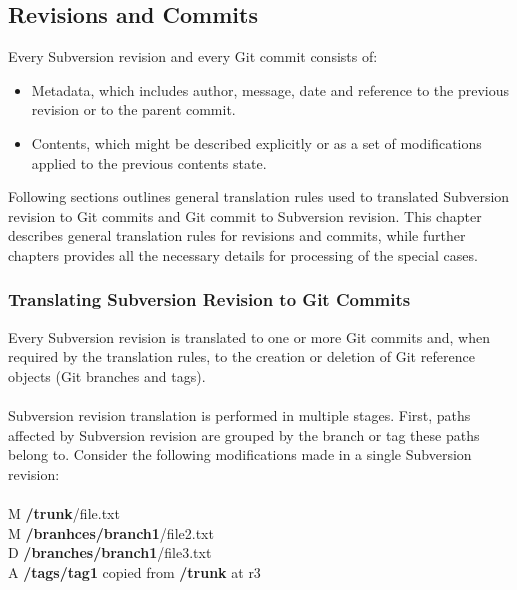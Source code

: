 \subsection{Revisions and Commits}
\label{section_revisions_and_commits}
\renewcommand{\figurename}{Diagram}
Every Subversion revision and every Git commit consists of:
\begin{itemize}
\item Metadata, which includes author, message, date and reference to the previous revision or to the parent commit.
\item Contents, which might be described explicitly or as a set of modifications applied to the previous contents state.
\end{itemize}
Following sections outlines general translation rules used to translated Subversion revision to Git commits and Git commit
to Subversion revision. This chapter describes general translation rules for revisions and commits, while further chapters provides all the 
necessary details for processing of the special cases.
\subsubsection{Translating Subversion Revision to Git Commits}
Every Subversion revision is translated to one or more Git commits and,
when required by the translation rules, to the creation or deletion of Git reference objects (Git branches and tags).
\\\\
Subversion revision translation is performed in multiple stages.
First, paths affected by Subversion revision are grouped by the branch or tag these paths belong to. 
Consider the following modifications made in a single Subversion revision:
\\\\
M \textbf{/trunk}/file.txt\\
M \textbf{/branhces/branch1}/file2.txt\\
D \textbf{/branches/branch1}/file3.txt\\
A \textbf{/tags/tag1} copied from \textbf{/trunk} at r3\\

